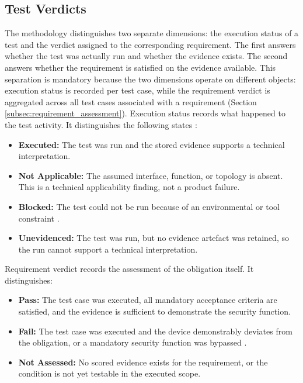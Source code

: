 \subsection{Test Verdicts} 
\label{subsec:verdicts} 

The methodology distinguishes two separate dimensions: the execution status of a test and the verdict assigned to the corresponding requirement. The first answers whether the test was actually run and whether the evidence exists. The second answers whether the requirement is satisfied on the evidence available. This separation is mandatory because the two dimensions operate on different objects: execution status is recorded per test case, while the requirement verdict is aggregated across all test cases associated with a requirement (Section \ref{subsec:requirement_assessment}). Execution status records what happened to the test activity. It distinguishes the following states \cite[p. 62]{glossar2013istqb}: 
\begin{itemize} 
	\item \textbf{Executed:} The test was run and the stored evidence supports a technical interpretation. 
	\item \textbf{Not Applicable:} The assumed interface, function, or topology is absent. This is a technical applicability finding, not a product failure. 
	\item \textbf{Blocked:} The test could not be run because of an environmental or tool constraint \cite[p. 11]{glossar2013istqb}. 
	\item \textbf{Unevidenced:} The test was run, but no evidence artefact was retained, so the run cannot support a technical interpretation.  
\end{itemize} 

Requirement verdict records the assessment of the obligation itself. It distinguishes: 

\begin{itemize} 
	\item \textbf{Pass:} The test case was executed, all mandatory acceptance criteria are satisfied, and the evidence is sufficient to demonstrate the security function. 
	\item \textbf{Fail:} The test case was executed and the device demonstrably deviates from the obligation, or a mandatory security function was bypassed \cite[p. 10]{glossar2013istqb}. 
	\item \textbf{Not Assessed:} No scored evidence exists for the requirement, or the condition is not yet testable in the executed scope. 
\end{itemize} 

